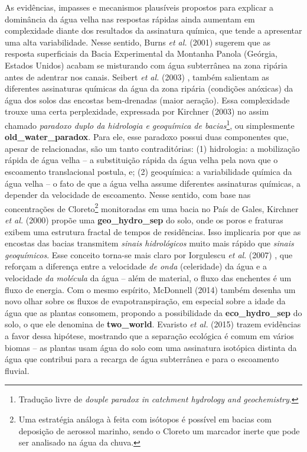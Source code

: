 \documentclass[./main.tex]{subfiles}
\begin{document}
\par As evidências, impasses e mecanismos plausíveis propostos para explicar a dominância da água velha nas respostas rápidas ainda aumentam em complexidade diante dos resultados da assinatura química, que tende a apresentar uma alta variabilidade. Nesse sentido, Burns \textit{et al.} (2001) \cite{burns2001quantifying} sugerem que as resposta superficiais da Bacia Experimental da Montanha Panola (Geórgia, Estados Unidos) acabam se misturando com água subterrânea na zona ripária antes de adentrar nos canais. Seibert \textit{et al.} (2003) \cite{seibert2003groundwater}, também salientam as diferentes assinaturas químicas da água da zona ripária (condições anóxicas) da água dos solos das encostas bem-drenadas (maior aeração). Essa complexidade trouxe uma certa perplexidade, expressada por Kirchner (2003) \cite{Kirchner2003} no assim chamado \textit{paradoxo duplo da hidrologia e geoquímica de bacias}\footnote{Tradução livre de \textit{douple paradox in catchment hydrology and geochemistry}.}, ou simplesmente \textbf{\gls{old_water_paradox}}. Para ele, esse paradoxo possui duas componentes que, apesar de relacionadas, são um tanto contraditórias: (1) hidrologia: a mobilização rápida de água velha -- a substituição rápida da água velha pela nova que o escoamento translacional postula, e; (2) geoquímica: a variabilidade química da água velha -- o fato de que a água velha assume diferentes assinaturas químicas, a depender da velocidade de escoamento. Nesse sentido, com base nas concentrações de Cloreto\footnote{Uma estratégia análoga à feita com isótopos é possível em bacias com deposição de aerossol marinho, sendo o Cloreto um marcador inerte que pode ser analisado na água da chuva.} monitoradas em uma bacia no País de Gales, Kirchner \textit{et al.} (2000) \cite{kirchner2000} propõe uma \textbf{\gls{geo_hydro_sep}} do solo, onde os poros e fraturas exibem uma estrutura fractal de tempos de residências. Isso implicaria por que as encostas das bacias transmitem \textit{sinais hidrológicos} muito mais rápido que \textit{sinais geoquímicos}. Esse conceito torna-se mais claro por Iorgulescu \textit{et al}. (2007) \cite{Iorgulescu2007}, que reforçam a diferença entre a velocidade \textit{de onda} (celeridade) da água e a velocidade \textit{da molécula} da água -- além de material, o fluxo das enchentes é um fluxo de energia. Com o mesmo espírito, McDonnell (2014) \cite{mcdonnell2014} também desenha um novo olhar sobre os fluxos de evapotranspiração, em especial sobre a idade da água que as plantas consomem, propondo a possibilidade da \textbf{\gls{eco_hydro_sep}} do solo, o que ele denomina de \textbf{\gls{two_world}}. Evaristo \textit{et al.} (2015) \cite{Evaristo2015} trazem evidências a favor dessa hipótese, mostrando que a separação ecológica é comum em vários biomas -- as plantas usam água do solo com uma assinatura isotópica distinta da água que contribui para a recarga de água subterrânea e para o escoamento fluvial.
\end{document}
